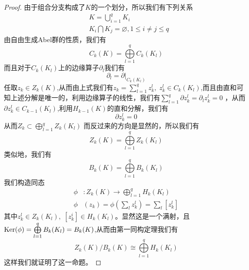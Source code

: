 \begin{proof}
由于组合分支构成了$K$的一个划分，所以我们有下列关系
\begin{equation*}
\begin{aligned}
         &K=\bigcup\limits_{i=1}^{q}K_{i}\\
         &K_{i}\bigcap K_{j}=\varnothing,1\leq i\neq j \leq q
\end{aligned}
\end{equation*}
由自由生成Abel群的性质，我们有
\begin{equation*}
    C_{k}(K)=\bigoplus\limits_{l=1}^{q}C_{k}(K_{l})
\end{equation*}
而且对于$C_{k}(K_{l})$上的边缘算子$\partial_{l}$我们有
\begin{equation*}
    \partial_{l}=\partial\left.\right|_{C_{k}(K_{l})}
\end{equation*}
任取$z_{k}\in Z_{k}(K)$,从而由上式我们有$z_{k}=\sum\limits_{l=1}^{q}z_{k}^{l},\;z^{l}_{k}\in C_{k}(K_{l})$,而且由直和可知上述分解是唯一的，利用边缘算子的线性，我们有$\sum\limits_{l=1}^{q}\partial z_{k}^{l}=\partial_{l} z_{k}^{l}=0$
，从而$\partial z_{k}^{l}\in C_{k-1}(K_{l})$,利用$H_{k-1}(K)$的直和分解，我们有
\begin{equation*}
    \partial z_{k}^{l}=0
\end{equation*}
从而$Z_{k}\subset \bigoplus\limits_{l=1}^{q}Z_{k}(K_{l}) $
而反过来的方向是显然的，所以我们有
\begin{equation*}
Z_{k}(K)= \bigoplus\limits_{l=1}^{q}Z_{k}(K_{l})
\end{equation*}
类似地，我们有
\begin{equation*}
B_{k}(K)= \bigoplus\limits_{l=1}^{q}B_{k}(K_{l})
\end{equation*}
我们构造同态
\begin{equation*}
    \begin{aligned}
             \phi&:Z_{k}(K)\longrightarrow \bigoplus\limits_{l=1}^{q}H_{k}(K_{l})\\
             \phi&(z_{k})=\phi(\sum\limits_{l}z_{k}^{l})=\sum\limits_{l}[z_{k}^{l}]
    \end{aligned}
\end{equation*}
其中$z_{k}^{l}\in Z_{k}(K_{l}),\;[z^{i}_{k}]\in H_{k}(K_{l})$。显然这是一个满射，且${\rm Ker}(\phi)=\bigoplus\limits_{l=1}^{q}B_{k}(K_{l})=B_{k}(K)$,从而由第一同构定理我们有
\begin{equation*}
    Z_{k}(K)/B_{k}(K)\cong \bigoplus\limits_{l=1}^{q}H_{k}(K_{l})
\end{equation*}
这样我们就证明了这一命题。
\end{proof}
